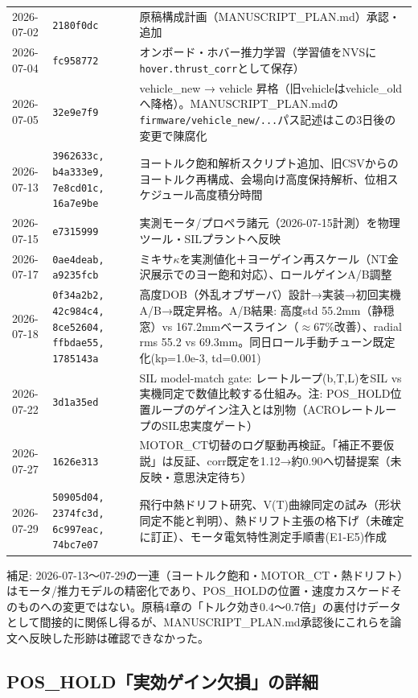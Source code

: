 \documentclass[a4paper,10pt]{ltjsarticle}
\begin{document}
\begin{longtable}{@{}p{2.0cm}p{3.3cm}p{9.9cm}@{}}
2026-07-02 & \texttt{2180f0dc} & 原稿構成計画（MANUSCRIPT\_PLAN.md）承認・追加 \\
2026-07-04 & \texttt{fc958772} & オンボード・ホバー推力学習（学習値をNVSに\texttt{hover.thrust\_corr}として保存） \\
2026-07-05 & \texttt{32e9e7f9} & vehicle\_new → vehicle 昇格（旧vehicleはvehicle\_oldへ降格）。MANUSCRIPT\_PLAN.mdの\texttt{firmware/vehicle\_new/...}パス記述はこの3日後の変更で陳腐化 \\
2026-07-13 & \texttt{3962633c, b4a333e9, 7e8cd01c, 16a7e9be} & ヨートルク飽和解析スクリプト追加、旧CSVからのヨートルク再構成、会場向け高度保持解析、位相スケジュール高度積分時間 \\
2026-07-15 & \texttt{e7315999} & 実測モータ/プロペラ諸元（2026-07-15計測）を物理ツール・SILプラントへ反映 \\
2026-07-17 & \texttt{0ae4deab, a9235fcb} & ミキサ$\kappa$を実測値化＋ヨーゲイン再スケール（NT金沢展示でのヨー飽和対応）、ロールゲインA/B調整 \\
2026-07-18 & \texttt{0f34a2b2, 42c984c4, 8ce52604, ffbdae55, 1785143a} & 高度DOB（外乱オブザーバ）設計→実装→初回実機A/B→既定昇格。A/B結果: 高度std 55.2mm（静穏窓）vs 167.2mmベースライン（$\approx$67\%改善）、radial rms 55.2 vs 69.3mm。同日ロール手動チューン既定化(kp=1.0e-3, td=0.001) \\
2026-07-22 & \texttt{3d1a35ed} & SIL model-match gate: レートループ(b,T,L)をSIL vs 実機同定で数値比較する仕組み。注: POS\_HOLD位置ループのゲイン注入とは別物（ACROレートループのSIL忠実度ゲート） \\
2026-07-27 & \texttt{1626e313} & MOTOR\_CT切替のログ駆動再検証。「補正不要仮説」は反証、corr既定を1.12→約0.90へ切替提案（未反映・意思決定待ち） \\
2026-07-29 & \texttt{50905d04, 2374fc3d, 6c997eac, 74bc7e07} & 飛行中熱ドリフト研究、V(T)曲線同定の試み（形状同定不能と判明）、熱ドリフト主張の格下げ（未確定に訂正）、モータ電気特性測定手順書(E1-E5)作成 \\
\bottomrule
\end{longtable}

補足: 2026-07-13〜07-29の一連（ヨートルク飽和・MOTOR\_CT・熱ドリフト）はモータ/推力モデルの精密化であり、POS\_HOLDの位置・速度カスケードそのものへの変更ではない。原稿4章の「トルク効き0.4〜0.7倍」の裏付けデータとして間接的に関係し得るが、MANUSCRIPT\_PLAN.md承認後にこれらを論文へ反映した形跡は確認できなかった。

\subsection{POS\_HOLD「実効ゲイン欠損」の詳細}
\end{document}

